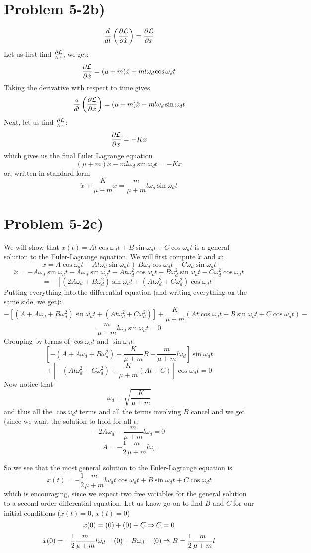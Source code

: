 \section*{Problem 5-2b)}
 \[ \frac{d}{dt}\left(\frac{\partial \mathcal{L}}{\partial \dot{x}}\right)=\frac{\partial \mathcal{L}}{\partial x} \]
Let us first find $\frac{\partial \mathcal{L}}{\partial \dot{x}}$, we get:
\[ \frac{\partial \mathcal{L}}{\partial \dot{x}} = (\mu+m)\dot{x} + ml\omega_d\cos\omega_d t \]
Taking the derivative with respect to time gives
\[ \frac{d}{dt}\left(\frac{\partial \mathcal{L}}{\partial \dot{x}}\right)=
(\mu + m)\ddot{x} - ml\omega_d\sin \omega_d t \]
Next, let us find $\frac{\partial \mathcal{L}}{\partial x}$:
\[\frac{\partial \mathcal{L}}{\partial x}  = -Kx \]
which gives us the final Euler Lagrange equation
\[  (\mu + m)\ddot{x} - ml\omega_d\sin \omega_d t  = -Kx \]
or, written in standard form
\[ \ddot{x} + \frac{K}{\mu + m} x = \frac{m}{\mu + m}l\omega_d\sin \omega_d t \]
\section*{Problem 5-2c)}
\newcommand{\comt}{\cos\omega_d t}
\newcommand{\somt}{\sin\omega_d t}
\newcommand{\om}{\omega_d}
We will show that $x(t) = At\cos \omega_d t + B\sin\omega_d t + C\cos \omega_d t$ is a general solution to the Euler-Lagrange  equation. We will first compute $\dot{x}$ and $\ddot{x}$:
\[ \dot{x} = A\comt - At\om\somt + B\om\comt - C\om\somt  \]
\[ \ddot{x} = -A\om\somt - A\om\somt - At\om^2\comt - B\om^2\somt - C\om^2\comt  \]\[ =  -\left[ (2A\om+B\om^2)\somt + (At\om^2 +C\om^2)\comt \right] \]
Putting everything into the differential equation (and writing everything on the same side, we get):
\[ -\left[ (A+A\om+B\om^2)\somt + (At\om^2 +C\om^2) \right] + \frac{K}{\mu+m} (At\cos \omega_d t + B\sin\omega_d t + C\cos \omega_d t) - \]\[ \frac{m}{\mu+m} l\om \somt =  0\]
\newcommand{\kmmu}{\frac{K}{\mu+m}}
Grouping by terms of $\comt$ and $\somt$:
\[ \left[-(A+A\omega_d+B\omega_d^2)+\kmmu B - \frac{m}{\mu+m}l\om\right]\somt \]\[+
\left[ -(At\om^2 + C\om^2) + \kmmu(At + C) \right] \comt
 = 0\]
 Now notice that
 \[ \om = \sqrt{\kmmu} \]
 and thus all the $\comt$ terms and all the terms involving $B$ cancel and we get (since we want the solution to hold for all $t$:
 \[ -2A\om - \frac{m}{\mu + m}l\omega_d = 0 \] 
\newcommand{\Aconst}{-\frac{1}{2}\frac{m}{\mu + m}l\om}
\[ A = \Aconst \]

So we see that the most general solution to the Euler-Lagrange equation is
\[ x(t) = \Aconst t \comt + B\somt+ C\comt \]
which is encouraging, since we expect two free variables for the general solution to a second-order differential equation. Let us know go on to find $B$ and $C$ for our initial conditions ($x(t) = 0$, $\dot{x}(t) = 0$)
\[ x(0) = (0) + (0) + C \Rightarrow C = 0 \]
\[ \dot{x}(0) = \Aconst - (0) + B\om - (0) \so B = \frac{1}{2}\frac{m}{\mu + m}l \]
\newcommand{\Bconst}{\frac{1}{2}\frac{m}{\mu + m}l}
